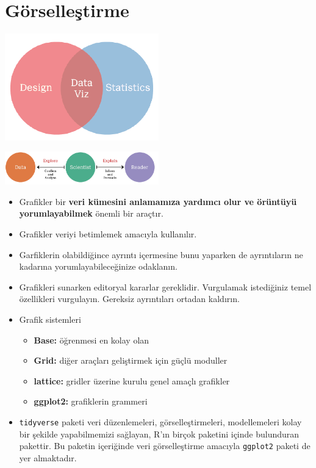 \documentclass[
  oneside]{book}
\begin{document}
\hypertarget{guxf6rselleux15ftirme}{%
\section{Görselleştirme}\label{guxf6rselleux15ftirme}}

\includegraphics[width=0.5\textwidth,height=\textheight]{images/v1.PNG}

\includegraphics[width=0.5\textwidth,height=\textheight]{images/v2.PNG}

\begin{itemize}
\item
  Grafikler bir \textbf{veri kümesini anlamamıza yardımcı olur ve örüntüyü yorumlayabilmek} önemli bir araçtır.
\item
  Grafikler veriyi betimlemek amacıyla kullanılır.
\item
  Garfiklerin olabildiğince ayrıntı içermesine bunu yaparken de ayrıntıların ne kadarına yorumlayabileceğinize odaklanın.
\item
  Grafikleri sunarken editoryal kararlar gereklidir. Vurgulamak istediğiniz temel özellikleri vurgulayın. Gereksiz ayrıntıları ortadan kaldırın.
\item
  Grafik sistemleri

  \begin{itemize}
  \item
    \textbf{Base:} öğrenmesi en kolay olan
  \item
    \textbf{Grid:} diğer araçları geliştirmek için güçlü moduller
  \item
    \textbf{lattice:} gridler üzerine kurulu genel amaçlı grafikler
  \item
    \textbf{ggplot2:} grafiklerin grammeri
  \end{itemize}
\item
  \texttt{tidyverse} paketi veri düzenlemeleri, görselleştirmeleri, modellemeleri kolay bir şekilde yapabilmemizi sağlayan, R'ın birçok paketini içinde bulunduran pakettir. Bu paketin içeriğinde veri görselleştirme amacıyla \texttt{ggplot2} paketi de yer almaktadır.
\end{itemize}
\end{document}
